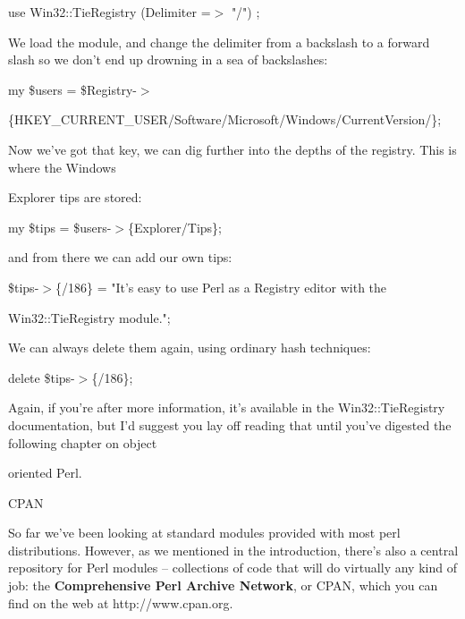 \documentclass[a4paper,11pt]{book}
\begin{document}
\noindent use Win32::TieRegistry (Delimiter =$>$ "/") ;

\noindent 

\noindent We load the module, and change the delimiter from a backslash to a forward slash so we don't end up drowning in a sea of backslashes:

\noindent 

\noindent my \$users = \$Registry-$>$

\noindent \{HKEY\_CURRENT\_USER/Software/Microsoft/Windows/CurrentVersion/\};

\noindent 

\noindent Now we've got that key, we can dig further into the depths of the registry. This is where the Windows

\noindent Explorer tips are stored:

\noindent 

\noindent my \$tips = \$users-$>$\{Explorer/Tips\};

\noindent 

\noindent 

\noindent and from there we can add our own tips:

\noindent 

\noindent \$tips-$>$\{/186\} = "It's easy to use Perl as a Registry editor with the

\noindent Win32::TieRegistry module.";

\noindent 

\noindent We can always delete them again, using ordinary hash techniques:

\noindent 

\noindent delete \$tips-$>$\{/186\};

\noindent 

\noindent Again, if you're after more information, it's available in the Win32::TieRegistry documentation, but I'd suggest you lay off reading that until you've digested the following chapter on object

\noindent oriented Perl.

\noindent 

\noindent 

\noindent CPAN

\noindent 

\noindent So far we've been looking at standard modules provided with most perl distributions. However, as we mentioned in the introduction, there's also a central repository for Perl modules -- collections of code that will do virtually any kind of job: the \textbf{Comprehensive Perl Archive Network}, or CPAN, which you can find on the web at http://www.cpan.org.
\end{document}
